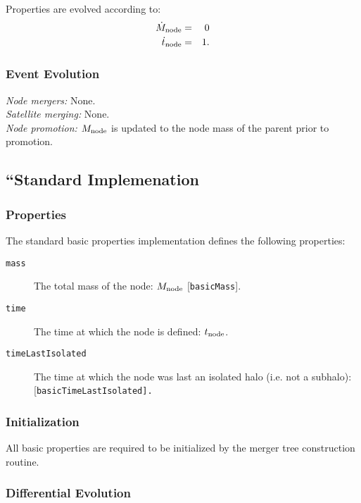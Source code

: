 Properties are evolved according to:
\begin{eqnarray}
 \dot{M}_{\rm node} &=& 0 \\
 \dot{t}_{\rm node} &=& 1.
\end{eqnarray}

\subsubsection{Event Evolution}

\noindent\emph{Node mergers:} None.\\

\noindent\emph{Satellite merging:} None.\\

\noindent\emph{Node promotion:} $M_{\rm node}$ is updated to the \gls{node} mass of the parent prior to promotion.\\

\subsection{``Standard Implemenation}

\subsubsection{Properties}

The standard basic properties implementation defines the following properties:
\begin{description}
 \item [{\tt mass}] The total mass of the node: $M_{\rm node}$ [{\tt basicMass}].
 \item [{\tt time}] The time at which the \gls{node} is defined: $t_{\rm node}$.
 \item [{\tt timeLastIsolated}] The time at which the \gls{node} was last an isolated halo (i.e. not a subhalo): [\tt basicTimeLastIsolated].
\end{description}

\subsubsection{Initialization}

All basic properties are required to be initialized by the merger tree construction routine.

\subsubsection{Differential Evolution}

